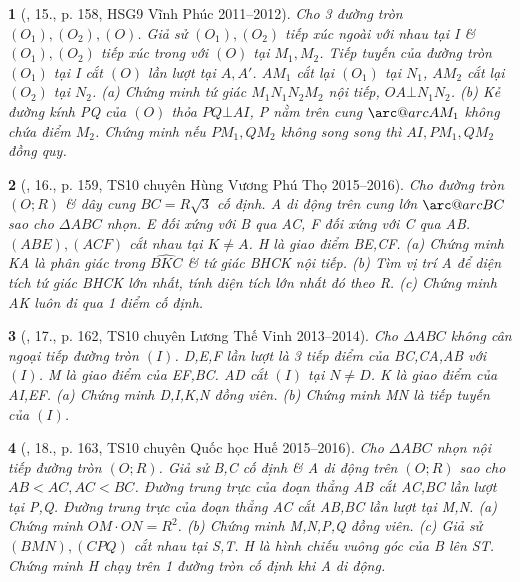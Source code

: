 \documentclass{article}
\makeatletter
\newcommand{\arc@char}{{\usefont{U}{tipa}{m}{n}\symbol{62}}}%
\newcommand{\arc}[1]{\mathpalette\arc@arc{#1}}
\newcommand{\arc@arc}[2]{%
	\sbox0{$\m@th#1#2$}%
	\vbox{
		\hbox{\resizebox{\wd0}{\height}{\arc@char}}
		\nointerlineskip
		\box0
	}%
}
\newtheorem{baitoan}{}
\makeatother
\begin{document}
\begin{baitoan}[\cite{Thu_Chung_Viet_Minh_circ}, 15., p. 158, HSG9 Vĩnh Phúc 2011--2012]
	Cho 3 đường tròn $(O_1),(O_2),(O)$. Giả sử $(O_1),(O_2)$ tiếp xúc ngoài với nhau tại I \& $(O_1),(O_2)$ tiếp xúc trong với $(O)$ tại $M_1,M_2$. Tiếp tuyến của đường tròn $(O_1)$ tại I cắt $(O)$ lần lượt tại $A,A'$. $AM_1$ cắt lại $(O_1)$ tại $N_1$, $AM_2$ cắt lại $(O_2)$ tại $N_2$. (a) Chứng minh tứ giác $M_1N_1N_2M_2$ nội tiếp, $OA\bot N_1N_2$. (b) Kẻ đường kính PQ của $(O)$ thỏa $PQ\bot AI$, P nằm trên cung $\arc{AM_1}$ không chứa điểm $M_2$. Chứng minh nếu $PM_1,QM_2$ không song song thì $AI,PM_1,QM_2$ đồng quy.
\end{baitoan}

\begin{baitoan}[\cite{Thu_Chung_Viet_Minh_circ}, 16., p. 159, TS10 chuyên Hùng Vương Phú Thọ 2015--2016]
	Cho đường tròn $(O;R)$ \& dây cung $BC = R\sqrt{3}$ cố định. A di động trên cung lớn $\arc{BC}$ sao cho $\Delta ABC$ nhọn. E đối xứng với B qua AC, F đối xứng với C qua AB. $(ABE),(ACF)$ cắt nhau tại $K\ne A$. H là giao điểm BE,CF. (a) Chứng minh KA là phân giác trong $\widehat{BKC}$ \& tứ giác BHCK nội tiếp. (b) Tìm vị trí A để diện tích tứ giác BHCK lớn nhất, tính diện tích lớn nhất đó theo R. (c) Chứng minh AK luôn đi qua 1 điểm cố định.
\end{baitoan}

\begin{baitoan}[\cite{Thu_Chung_Viet_Minh_circ}, 17., p. 162, TS10 chuyên Lương Thế Vinh 2013--2014]
	Cho $\Delta ABC$ không cân ngoại tiếp đường tròn $(I)$. D,E,F lần lượt là 3 tiếp điểm của BC,CA,AB với $(I)$. M là giao điểm của EF,BC. AD cắt $(I)$ tại $N\ne D$. K là giao điểm của AI,EF. (a) Chứng minh D,I,K,N đồng viên. (b) Chứng minh MN là tiếp tuyến của $(I)$.
\end{baitoan}

\begin{baitoan}[\cite{Thu_Chung_Viet_Minh_circ}, 18., p. 163, TS10 chuyên Quốc học Huế 2015--2016]
	Cho $\Delta ABC$ nhọn nội tiếp đường tròn $(O;R)$. Giả sử B,C cố định \& A di động trên $(O;R)$ sao cho $AB < AC,AC < BC$. Đường trung trực của đoạn thẳng AB cắt AC,BC lần lượt tại P,Q. Đường trung trực của đoạn thẳng AC cắt AB,BC lần lượt tại M,N. (a) Chứng minh $OM\cdot ON = R^2$. (b) Chứng minh M,N,P,Q đồng viên. (c) Giả sử $(BMN),(CPQ)$ cắt nhau tại S,T. H là hình chiếu vuông góc của B lên ST. Chứng minh H chạy trên 1 đường tròn cố định khi A di động.
\end{baitoan}
\end{document}
